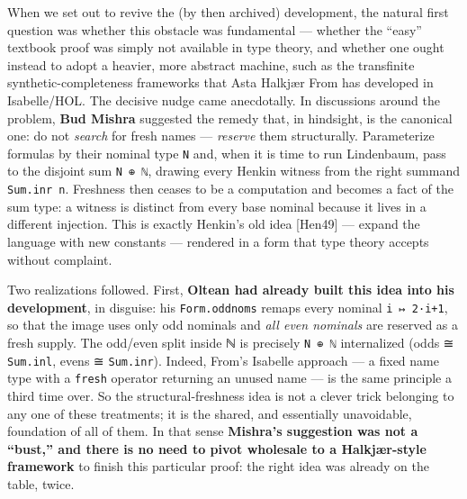 \documentclass[11pt,a4paper]{article}
\renewcommand{\_}{\origtextunderscore\allowbreak}
\begin{document}
When we set out to revive the (by then archived) development, the natural first question was whether this obstacle was fundamental --- whether the ``easy'' textbook proof was simply not available in type theory, and whether one ought instead to adopt a heavier, more abstract machine, such as the transfinite synthetic-completeness frameworks that Asta Halkjær From has developed in Isabelle/HOL. The decisive nudge came anecdotally. In discussions around the problem, \textbf{Bud Mishra} suggested the remedy that, in hindsight, is the canonical one: do not \emph{search} for fresh names --- \emph{reserve} them structurally. Parameterize formulas by their nominal type \texttt{N} and, when it is time to run Lindenbaum, pass to the disjoint sum \texttt{N\ ⊕\ ℕ}, drawing every Henkin witness from the right summand \texttt{Sum.inr\ n}. Freshness then ceases to be a computation and becomes a fact of the sum type: a witness is distinct from every base nominal because it lives in a different injection. This is exactly Henkin's old idea {[}Hen49{]} --- expand the language with new constants --- rendered in a form that type theory accepts without complaint.

Two realizations followed. First, \textbf{Oltean had already built this idea into his development}, in disguise: his \texttt{Form.odd\_noms} remaps every nominal \texttt{i\ ↦\ 2·i+1}, so that the image uses only odd nominals and \emph{all even nominals} are reserved as a fresh supply. The odd/even split inside ℕ is precisely \texttt{N\ ⊕\ ℕ} internalized (odds ≅ \texttt{Sum.inl}, evens ≅ \texttt{Sum.inr}). Indeed, From's Isabelle approach --- a fixed name type with a \texttt{fresh} operator returning an unused name --- is the same principle a third time over. So the structural-freshness idea is not a clever trick belonging to any one of these treatments; it is the shared, and essentially unavoidable, foundation of all of them. In that sense \textbf{Mishra's suggestion was not a ``bust,'' and there is no need to pivot wholesale to a Halkjær-style framework} to finish this particular proof: the right idea was already on the table, twice.
\end{document}
